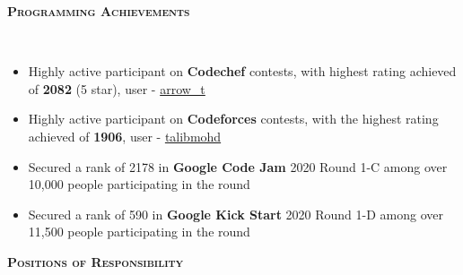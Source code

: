 \documentclass[9pt]{article}
\newenvironment{changemargin}[2]{%
  \begin{list}{}{%
    \setlength{\topsep}{2pt}%
    \setlength{\leftmargin}{#1}%
    \setlength{\rightmargin}{#2}%
    \setlength{\listparindent}{\parindent}%
    \setlength{\itemindent}{\parindent}%
    \setlength{\parsep}{\parskip}%
  }%
  \item[]}{\end{list}
}
\newcommand{\lineover}{
	\begin{changemargin}{0in}{0in}
		\vspace*{-18pt}
		\hrulefill \\
		\vspace*{-8pt}
	\end{changemargin}
}
\newcommand{\header}[1]{
	\begin{changemargin}{-0.5in}{-0.5in}
	\vspace{-4pt}
		\Large\bfseries\scshape{#1}\hrulefill
  	\lineover
	\end{changemargin}
}
\newenvironment{body} {
	\vspace*{-16pt}
	\begin{changemargin}{-0.4in}{-0.5in}
  }	
	{\end{changemargin}
}
\begin{document}

\vspace{-8pt}
\header{Programming Achievements}
\begin{body}
\vspace{17pt}
\begin{itemize} \itemsep -1pt
    \itemindent=-1.0em
    \item Highly active participant on \textbf{Codechef} contests, with highest rating achieved of \textbf{2082} (5 star), user - \href{https://www.codechef.com/users/arrow_t}{arrow\_t}
    \item Highly active participant on \textbf{Codeforces} contests, with the highest rating achieved of \textbf{1906}, user - \href{https://codeforces.com/profile/talibmohd}{talibmohd}
    \item Secured a rank of 2178 in \textbf{Google Code Jam} 2020 Round 1-C among over 10,000 people participating in the round
    \item Secured a rank of 590 in \textbf{Google Kick Start} 2020 Round 1-D among over 11,500 people participating in the round
\end{itemize}
\end{body}
\vspace{-6pt}
\header{Positions of Responsibility}
\end{document}
